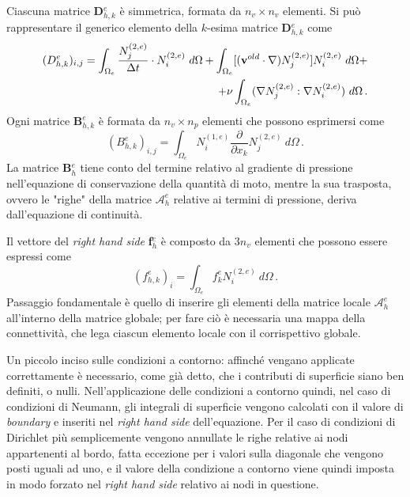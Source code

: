 Ciascuna matrice \textbf{D}$_{h,k}^e$ è simmetrica, formata da $n_v \times n_v$ elementi.
Si può rappresentare il generico elemento della $k$-esima matrice \textbf{D}$_{h,k}^e$ come
\begin{eqnarray}
(D_{h,k}^e)_{i,j}=\int_{\Omega_e}\frac{N_j^{(2,e)}}{\Delta t}\cdot N_i^{(2,e)}\ d \Omega
	+\int_{\Omega_e}[({\bf v}^{old}
	\cdot\nabla) N_j^{(2,e)}]N_i^{(2,e)} \ d\Omega
 + \\
	+  \nu\int_{\Omega_e} (\nabla N_j^{(2,e)}:\nabla N_i^{(2,e)}) \ d\Omega \,.
 \nonumber
\end{eqnarray}
Ogni matrice \textbf{B}$_{h,k}^e$ è formata da $n_{v} \times n_{p}$ elementi
che possono esprimersi come
\begin{equation}
	(B_{h,k}^e)_{i,j}=\int_{\Omega_e}N_i^{(1,e)}\frac{\partial}{\partial x_{k}} N_j^{(2,e)} \ d\Omega\,. 
\end{equation}
La matrice \textbf{B}$_h^e$ tiene conto del termine relativo 
al gradiente di pressione nell'equazione di conservazione della
quantità di moto, mentre la sua trasposta, ovvero le "righe" della
matrice $\mathcal{A}_h^e$ relative ai termini di pressione,
deriva dall'equazione di continuità.

Il vettore del \textit{right hand side} \textbf{f}$_h^e$ è composto da $3n_v$ elementi
che possono essere espressi come
\begin{equation}
	(f_{h,k}^e)_i=\int_{\Omega_e}f_k^e N_i^{(2,e)} \ d\Omega \,.
\end{equation}
Passaggio fondamentale è quello di inserire gli elementi della matrice
locale $\mathcal{A}_h^e$ all'interno della matrice globale; per fare ciò 
è necessaria una mappa della connettività, che lega ciascun elemento locale 
con il corrispettivo globale.

Un piccolo inciso sulle condizioni a contorno: affinché vengano applicate correttamente 
è necessario, come già detto, che i contributi di superficie siano ben definiti, o nulli.
Nell'applicazione delle condizioni a contorno quindi, nel caso di condizioni di
Neumann, gli integrali di superficie vengono calcolati con il valore di \textit{boundary}
e inseriti nel \textit{right hand side} dell'equazione.
Per il caso di condizioni di Dirichlet più semplicemente
vengono annullate le righe relative ai nodi appartenenti al bordo, fatta eccezione 
per i valori sulla diagonale che vengono posti uguali ad uno, e il valore della condizione
a contorno viene quindi imposta in modo forzato
nel \textit{right hand side} relativo ai nodi in questione.


 







